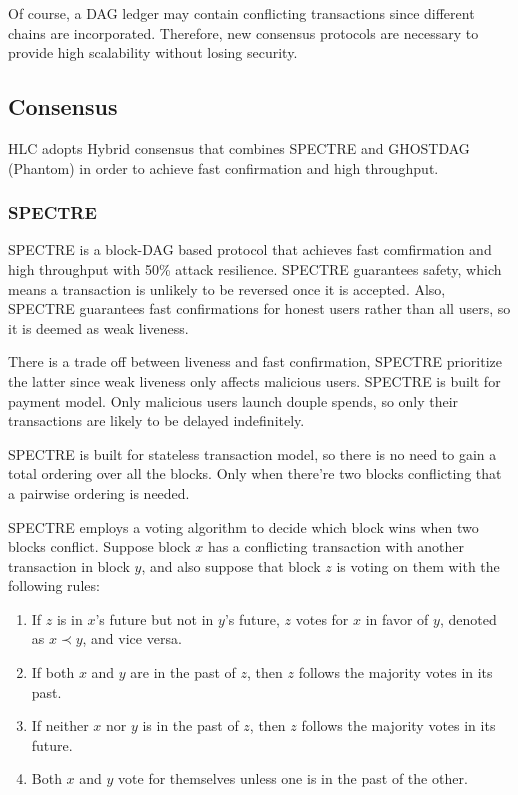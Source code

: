 \documentclass[a4paper,11pt]{article}
\begin{document}
Of course, a DAG ledger may contain conflicting transactions since different
chains are incorporated. Therefore, new consensus protocols are necessary to
provide high scalability without losing security.

\subsection{Consensus}
HLC adopts Hybrid consensus that combines SPECTRE and GHOSTDAG (Phantom) in order to achieve fast confirmation and high throughput.


\subsubsection*{SPECTRE}
SPECTRE is a block-DAG based protocol that achieves fast comfirmation and high
throughput with 50\% attack resilience. SPECTRE guarantees safety, which means a
transaction is unlikely to be reversed once it is accepted. Also, SPECTRE guarantees fast confirmations for honest users rather than all users, so it is deemed as weak liveness.

There is a trade off between liveness and fast confirmation, SPECTRE prioritize
the latter since weak liveness only affects malicious users. SPECTRE is built
for payment model. Only malicious users launch douple spends, so only their
transactions are likely to be delayed indefinitely.

SPECTRE is built for stateless transaction model, so there is no need to gain a
total ordering over all the blocks. Only when there're two blocks conflicting
that a pairwise ordering is needed.

SPECTRE employs a voting algorithm to decide which block wins when two blocks
conflict. Suppose block $x$ has a conflicting transaction with another
transaction in block $y$, and also suppose that block $z$ is voting on them with
the following rules:


\begin{enumerate}
	\item If $z$ is in $x$'s future but not in $y$'s future, $z$ votes for
		$x$ in favor of $y$, denoted as $x \prec y$, and vice versa.
	\item If both $x$ and $y$ are in the past of $z$, then $z$ follows the majority votes in its past.
	\item If neither $x$ nor $y$ is in the past of $z$, then $z$ follows the majority votes in its future.
	\item Both $x$ and $y$ vote for themselves unless one is in the past of
		the other.
\end{enumerate}
\end{document}
